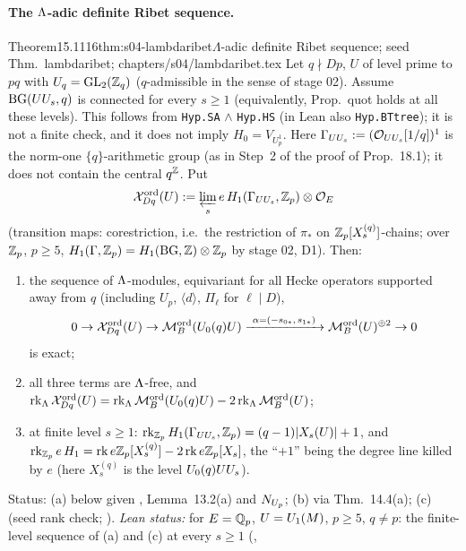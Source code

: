 \paragraph{The $\Lambda$-adic definite Ribet sequence.}
\begin{quoted}{Theorem}{15.1}{116}{thm:s04-lambdaribet}{$\Lambda$-adic definite Ribet sequence; seed Thm.~lambdaribet; }{chapters/s04/lambdaribet.tex}\label{rpt:thm:s04-lambdaribet}
Let $q\nmid Dp$, $U$ of level prime to $pq$ with $U_q=\mathrm{GL}_2(\mathbb{Z}_q)$ ($q$-admissible in the sense of stage 02). Assume $\mathrm{BG}(UU_s,q)$ is
connected for every $s\ge1$ (equivalently, Prop.~quot holds at all these levels). This follows from \texttt{Hyp.SA} $\wedge$
\texttt{Hyp.HS} (in Lean also \texttt{Hyp.BTtree}); it is not a finite check, and it does not imply $H_0=V_{U_p^1}$.
Here $\Gamma_{UU_s}:=(\mathcal{O}_{UU_s}[1/q])^1$ is the norm-one $\{q\}$-arithmetic group (as in Step~2 of the proof of Prop.~18.1); it does not
contain the central $q^{\mathbb{Z}}$. Put
\[\mathcal{X}^{\mathrm{ord}}_{Dq}(U):=\varprojlim_se\,H_1(\Gamma_{UU_s},\mathbb{Z}_p)\otimes\mathcal{O}_E\]
(transition maps: corestriction, i.e.\ the restriction of $\pi_*$ on $\mathbb{Z}_p[X^{(q)}_s]$-chains; over $\mathbb{Z}_p$, $p\ge5$,
$H_1(\Gamma,\mathbb{Z}_p)=H_1(\mathrm{BG},\mathbb{Z})\otimes\mathbb{Z}_p$ by stage 02, D1). Then:
\begin{enumerate}[label=(\alph*)]
\item the sequence of $\Lambda$-modules, equivariant for all Hecke operators supported away from $q$ (including $U_p$, $\langle d\rangle$,
  $\Pi_\ell$ for $\ell\mid D$),
  \[0\to\Xord_{Dq}(U)\to\Mord(\Uzero{q}U)\xrightarrow{\ \alpha=(-s_{0*},\,s_{1*})\ }\Mord(U)^{\oplus2}\to0\]
  is exact;
\item all three terms are $\Lambda$-free, and $\operatorname{rk}_\Lambda\mathcal{X}^{\mathrm{ord}}_{Dq}(U)=\operatorname{rk}_\Lambda\mathcal{M}^{\mathrm{ord}}_B(U_0(q)U)-2\operatorname{rk}_\Lambda\mathcal{M}^{\mathrm{ord}}_B(U)$;
\item at finite level $s\ge1$: $\operatorname{rk}_{\mathbb{Z}_p}H_1(\Gamma_{UU_s},\mathbb{Z}_p)=(q-1)|X_s(U)|+1$, and $\operatorname{rk}_{\mathbb{Z}_p}e\,H_1=\operatorname{rk} e\mathbb{Z}_p[X^{(q)}_{s}]-2\operatorname{rk} e\mathbb{Z}_p[X_s]$,
  the ``$+1$'' being the degree line killed by $e$ (here $X^{(q)}_s$ is the level $U_0(q)UU_s$).
\end{enumerate}
Status: (a) \stproved{} below given , Lemma~13.2(a) and $N_{U_p}$; (b) \stproved{} via
Thm.~14.4(a); (c) \stproved{} (seed rank check; ). \emph{Lean status:} \stformal{} for $E=\mathbb{Q}_p$, $U=U_1(M)$, $p\ge5$, $q\ne p$:
the finite-level sequence of (a) and (c) at every $s\ge1$ (,

\end{quoted}
